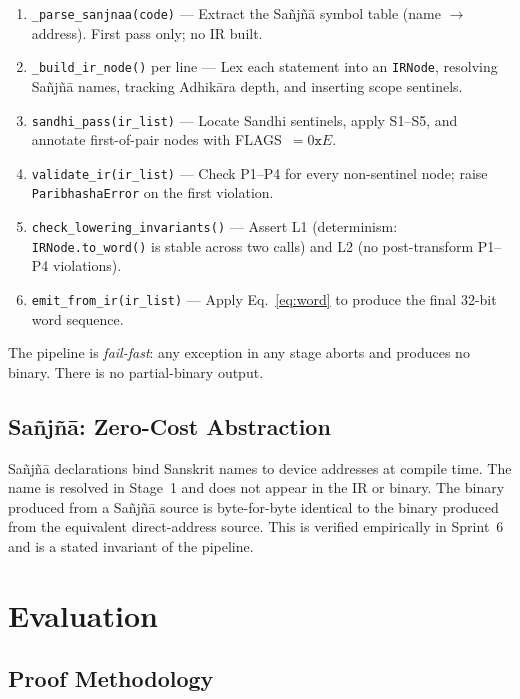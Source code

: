 \documentclass[11pt,a4paper]{article}
\begin{document}
\begin{enumerate}
\item \texttt{\_parse\_sanjnaa(code)} --- Extract the Sa\~{n}j\~{n}\={a}
  symbol table (name $\to$ address). First pass only; no IR built.
\item \texttt{\_build\_ir\_node()} per line --- Lex each statement into an
  \texttt{IRNode}, resolving Sa\~{n}j\~{n}\={a} names, tracking
  Adhi\-k\={a}ra depth, and inserting scope sentinels.
\item \texttt{sandhi\_pass(ir\_list)} --- Locate Sandhi sentinels, apply
  S1--S5, and annotate first-of-pair nodes with FLAGS~$= 0\texttt{x}E$.
\item \texttt{validate\_ir(ir\_list)} --- Check P1--P4 for every
  non-sentinel node; raise \texttt{Paribha\-sha\-Error} on the first violation.
\item \texttt{check\_lowering\_invariants()} --- Assert L1 (determinism:
  \texttt{IRNode.to\_word()} is stable across two calls) and L2 (no
  post-transform P1--P4 violations).
\item \texttt{emit\_from\_ir(ir\_list)} --- Apply Eq.~\eqref{eq:word} to
  produce the final 32-bit word sequence.
\end{enumerate}

The pipeline is \emph{fail-fast}: any exception in any stage aborts and
produces no binary. There is no partial-binary output.

\subsection{Sa\~{n}j\~{n}\={a}: Zero-Cost Abstraction}

Sa\~{n}j\~{n}\={a} declarations bind Sanskrit names to device addresses at
compile time. The name is resolved in Stage~1 and does not appear in the IR
or binary. The binary produced from a Sa\~{n}j\~{n}\={a} source is
byte-for-byte identical to the binary produced from the equivalent
direct-address source. This is verified empirically in Sprint~6 and is a
stated invariant of the pipeline.

\section{Evaluation}
\label{sec:eval}

\subsection{Proof Methodology}
\end{document}

